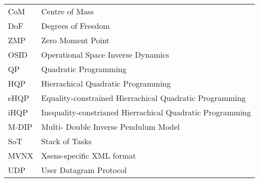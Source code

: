\documentclass{thesisreport}
\begin{document}
\begin{tabular}{p{3cm}p{15cm}}
CoM & Centre of Mass \\
DoF & Degrees of Freedom \\
ZMP & Zero Moment Point \\
OSID & Operational Space Inverse Dynamics \\
QP & Quadratic Programming \\
HQP & Hierrachical Quadratic Programming \\
eHQP & Equality-constrained Hierrachical Quadratic Programming \\
iHQP & Inequality-constrianed Hierrachical Quadratic Programming \\
M-DIP & Multi- Double Inverse Pendulum Model \\
SoT & Stack of Tasks \\
MVNX & Xsens-specific XML format \\
UDP & User Datagram Protocol \\



\end{tabular}

 \newpage
 
 \tableofcontents

 \listoffigures
 
\listoftables
 



\newpage


\newpage


\newpage


\newpage


\newpage


\newpage


 
 
 
 \appendix	
 
 
 
 
 
 
 
 
\end{document}
